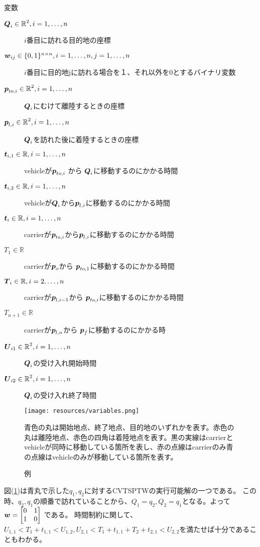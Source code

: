 \documentclass[11pt,a4paper,dvipdfmx,titlepage,uplatex]{jsarticle}
\theoremstyle{mystyle}
\newcommand{\0}{\mathbf{0}}
\def\p{\mbox{\boldmath $p$}}
\def\t{\mbox{\boldmath $t$}}
\def\w{\mbox{\boldmath $w$}}
\def\Q{\mbox{\boldmath $Q$}}
\def\T{\mbox{\boldmath $T$}}
\def\U{\mbox{\boldmath $U$}}
\def\Real{\mbox{$\mathbb{R}$}}
\begin{document}
	\begin{itembox}[l]{変数}
		\begin{description}
			\item[$\Q_i\in \Real^2, i=1,\dots,n$] $i$番目に訪れる目的地の座標
			\item[$\w_{ij} \in \{0,1\}^{n\times n}, i=1,\dots,n,j=1,\dots,n$] $i$番目に目的地jに訪れる場合を１、それ以外を0とするバイナリ変数
			\item[$\p_{to, i}\in \Real^2, i=1,\dots,n$] $\Q_i$にむけて離陸するときの座標
			\item[$\p_{l, i}\in \Real^2, i=1,\dots,n$] $\Q_i$を訪れた後に着陸するときの座標
			\item[$\t_{i,1}\in \Real,i=1,\dots,n$] vehicleが$\p_{to, i}$ から $\Q_i$に移動するのにかかる時間
			\item[$\t_{i,2}\in \Real,i=1,\dots,n$]vehicleが$\Q_i$から$\p_{l, i}$に移動するのにかかる時間
			\item[$\t_i\in \Real,i=1,\dots,n$] carrierが$\p_{to, i}$から$\p_{l, i}$に移動するのにかかる時間
			\item[$T_1\in \Real$] carrierが$\p_o$から  $\p_{to, 1}$に移動するのにかかる時間
			\item[$\T_i\in \Real,i=2,\dots,n$] carrierが$\p_{l, i-1}$から  $\p_{to, i}$に移動するのにかかる時間
			\item[$T_{n+1}\in \Real$] carrierが$\p_{l,n}$から  $\p_{f}$に移動するのにかかる時
			\item[$\U_{i1}\in \Real^2, i=1,\dots,n$] $\Q_i$の受け入れ開始時間
			\item[$\U_{i2}\in \Real^2, i=1,\dots,n$] $\Q_i$の受け入れ終了時間
		\end{description}
	\end{itembox}
	
	\begin{figure}[htbp]
		\centering
		\texttt{[image: resources/variables.png]}
		\caption{例}
		\begin{minipage}[c]{0.7\hsize}
			青色の丸は開始地点、終了地点、目的地のいずれかを表す。赤色の丸は離陸地点、赤色の四角は着陸地点を表す。黒の実線はcarrierとvehicleが同時に移動している箇所を表し、赤の点線はcarrierのみ青の点線はvehicleのみが移動している箇所を表す。
		\end{minipage}
		\label{fig:definition_sample}
	\end{figure}
	
	図(\ref{fig:definition_sample})は青丸で示した$q_1, q_2$に対するCVTSPTWの実行可能解の一つである。
	この時、$q_2, q_1$の順番で訪れていることから、$Q_1 = q_2, Q_2=q_1$となる。よって
	$\w = 
	\begin{bmatrix}
		0 & 1 \\
		1 & 0 \\
	\end{bmatrix}
	$
	である。
	時間制約に関して、$U_{1,1}<T_1+t_{1,1} <U_{1,2}, U_{2,1}<T_1+t_{1,1}+T_2+t_{2,1}<U_{2,2}$を満たせば十分であることもわかる。
	
\end{document}
